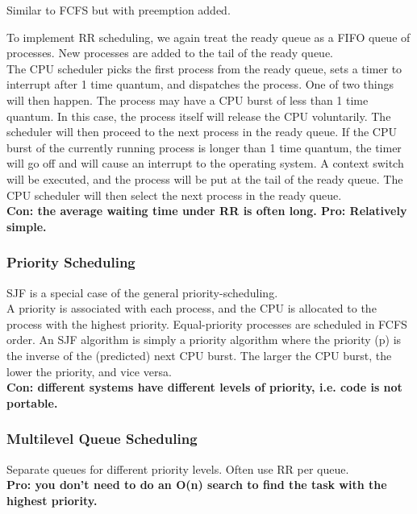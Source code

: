 \documentclass{article}
\begin{document}
Similar to FCFS but with preemption added. 

To implement RR scheduling, we again treat the ready queue as a FIFO
queue of processes. New processes are added to the tail of the ready queue.
\\
The CPU scheduler picks the first process from the ready queue, sets a timer to
interrupt after 1 time quantum, and dispatches the process.
One of two things will then happen. The process may have a CPU burst of
less than 1 time quantum. In this case, the process itself will release the CPU
voluntarily. The scheduler will then proceed to the next process in the ready
queue. If the CPU burst of the currently running process is longer than 1 time
quantum, the timer will go off and will cause an interrupt to the operating
system. A context switch will be executed, and the process will be put at the
tail of the ready queue. The CPU scheduler will then select the next process in
the ready queue.
\\

{\bf Con: the average waiting time under RR is often long. Pro: Relatively simple.}


\subsubsection{Priority Scheduling}

SJF is a special case of the general priority-scheduling. 
\\
A priority is associated with each process, and the CPU is allocated to the process with the highest priority. Equal-priority processes are scheduled in
FCFS order. An SJF algorithm is simply a priority algorithm where the priority
(p) is the inverse of the (predicted) next CPU burst. The larger the CPU burst,
the lower the priority, and vice versa.
\\


{\bf Con: different systems have different levels of priority, i.e. code is not portable.}



\subsubsection{Multilevel Queue Scheduling}

Separate queues for different priority levels. Often use RR per queue.
\\
{\bf Pro: you don't need to do an O(n) search to find the task with the highest priority.}
\end{document}
